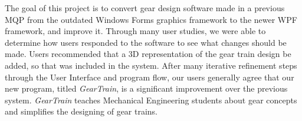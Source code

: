 \begin{doublespace}

The goal of this project is to convert gear design software made in a previous MQP from the outdated Windows Forms graphics framework to the newer WPF framework, and improve it. Through many user studies, we were able to determine how users responded to the software to see what changes should be made. Users recommended that a 3D representation of the gear train design be added, so that was included in the system. After many iterative refinement steps through the User Interface and program flow, our users generally agree that our new program, titled \emph{GearTrain}, is a significant improvement over the previous system. \emph{GearTrain} teaches Mechanical Engineering students about gear concepts and simplifies the designing of gear trains.

\end{doublespace}